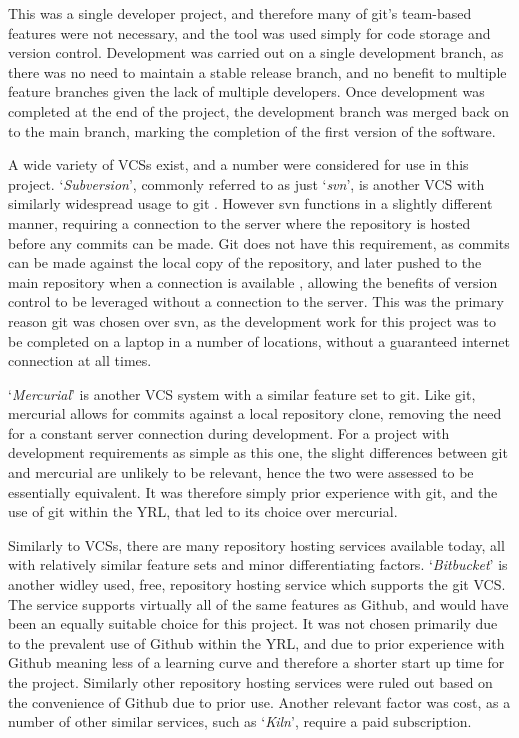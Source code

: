 This was a single developer project, and therefore many of git's team-based features were not necessary, and the tool was used simply for code storage and version control. Development was carried out on a single development branch, as there was no need to maintain a stable release branch, and no benefit to multiple feature branches given the lack of multiple developers. Once development was completed at the end of the project, the development branch was merged back on to the main branch, marking the completion of the first version of the software.

A wide variety of VCSs exist, and a number were considered for use in this project. `\textit{Subversion}', commonly referred to as just `\textit{svn}', is another VCS with similarly widespread usage to git \cite{Subversion}. However svn functions in a slightly different manner, requiring a connection to the server where the repository is hosted before any commits can be made. Git does not have this requirement, as commits can be made against the local copy of the repository, and later pushed to the main repository when a connection is available \cite{ProGit}, allowing the benefits of version control to be leveraged without a connection to the server. This was the primary reason git was chosen over svn, as the development work for this project was to be completed on a laptop in a number of locations, without a guaranteed internet connection at all times.

`\textit{Mercurial}' \cite{Mercurial} is another VCS system with a similar feature set to git. Like git, mercurial allows for commits against a local repository clone, removing the need for a constant server connection during development. For a project with development requirements as simple as this one, the slight differences between git and mercurial are unlikely to be relevant, hence the two were assessed to be essentially equivalent. It was therefore simply prior experience with git, and the use of git within the YRL, that led to its choice over mercurial.

Similarly to VCSs, there are many repository hosting services available today, all with relatively similar feature sets and minor differentiating factors. `\textit{Bitbucket}' is another widley used, free, repository hosting service which supports the git VCS. The service supports virtually all of the same features as Github, and would have been an equally suitable choice for this project. It was not chosen primarily due to the prevalent use of Github within the YRL, and due to prior experience with Github meaning less of a learning curve and therefore a shorter start up time for the project. Similarly other repository hosting services were ruled out based on the convenience of Github due to prior use. Another relevant factor was cost, as a number of other similar services, such as `\textit{Kiln}', require a paid subscription.

